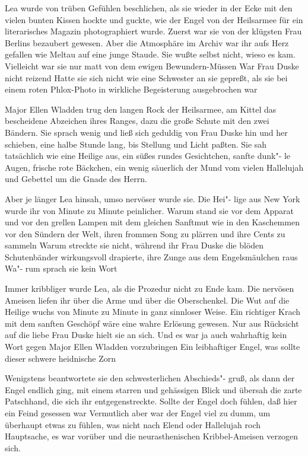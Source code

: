 Lea wurde von trüben Gefühlen beschlichen, als sie wieder
in der Ecke mit den vielen bunten Kissen hockte und guckte,
wie der Engel von der Heilsarmee für ein literarisches Magazin
photographiert wurde. Zuerst war sie von der klügsten Frau
Berlins bezaubert gewesen. Aber die Atmosphäre im Archiv
war ihr aufs Herz gefallen wie Meltau\label{lS63-1} auf eine junge Staude.
Sie wußte selbst nicht, wieso es kam. Vielleicht war sie nur
matt von dem ewigen Bewundern-Müssen\frag{} War Frau Duske
nicht reizend\frag{} Hatte sie sich nicht wie eine Schwester an sie
gepreßt, als sie bei einem roten Phlox-Photo\label{lS63-2} in wirkliche
Begeisterung ausgebrochen war\frag{}

Major Ellen Wladden trug den langen Rock der Heilsarmee, am
Kittel das bescheidene Abzeichen ihres Ranges, dazu die große
Schute mit den zwei Bändern. Sie sprach wenig und ließ sich
geduldig von Frau Duske hin und her schieben, eine halbe
Stunde lang, bis Stellung und Licht paßten. Sie sah tatsächlich
wie eine Heilige aus, ein süßes rundes Gesichtchen, sanfte dunk"-%
le Augen, frische rote Bäckchen, ein wenig säuerlich der Mund
vom vielen Hallelujah und Gebettel um die Gnade des Herrn.

Aber je länger Lea hinsah, umso nervöser wurde sie. Die Hei"-%
lige aus New York wurde ihr von Minute zu Minute peinlicher.
Warum stand sie vor dem Apparat und vor den grellen
Lampen mit dem gleichen Sanftmut wie in den Kaschemmen
vor den Sündern der Welt, ihren frommen Song zu plärren
und ihre Cents zu sammeln\frag{} Warum streckte sie nicht, während
ihr Frau Duske die blöden Schutenbänder wirkungsvoll
drapierte, ihre Zunge aus dem Engelsmäulchen raus\frag{} Wa"-%
rum sprach sie kein Wort\frag{}

Immer kribbliger wurde Lea, als die Prozedur nicht zu Ende
kam. Die nervösen Ameisen liefen ihr über die Arme und über
die Oberschenkel. Die Wut auf die Heilige wuchs von Minute
zu Minute in ganz sinnloser Weise. Ein richtiger Krach mit
dem sanften Geschöpf wäre eine wahre Erlösung gewesen.
Nur aus Rücksicht auf die liebe Frau Duske hielt sie an sich.
Und es war ja auch wahrhaftig kein Wort gegen Major Ellen
Wladden vorzubringen\frag{} Ein leibhaftiger Engel, was sollte
dieser schwere heidnische Zorn\frag{}

Wenigstens beantwortete sie den schwesterlichen Abschieds"-%
gruß, als dann der Engel endlich ging, mit einem starren und
gehässigen Blick und übersah die zarte Patschhand, die sich ihr
entgegenstreckte. Sollte der Engel doch fühlen, daß hier ein
Feind gesessen war\ausr{} Vermutlich aber war der Engel viel zu
dumm, um überhaupt etwas zu fühlen, was nicht nach Elend
oder Hallelujah roch\frag{} Hauptsache, es war vorüber und die
neurasthenischen Kribbel-Ameisen verzogen sich.

